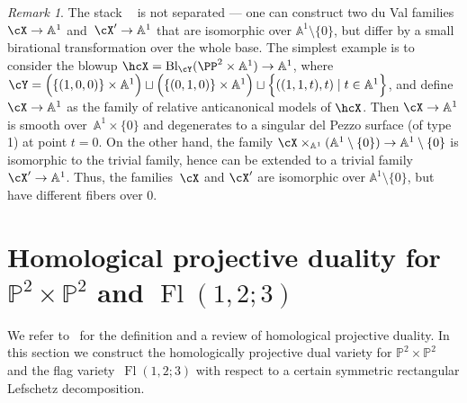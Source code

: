 \documentclass[11pt]{amsart}
\renewcommand{\AA}{{\mathbb{A}}}
\renewcommand{\P}{{\mathbb{P}}}
\DeclareMathOperator{\Bl}{\mathrm{Bl}}
\DeclareMathOperator{\Fl}{\mathrm{Fl}}
\DeclareMathOperator{\DP}{{\mathfrak{DP}_6}}
\theoremstyle{plain}
\theoremstyle{definition}
\theoremstyle{remark}
\newtheorem{remark}[theorem]{Remark}
\begin{document}
\begin{remark}
The stack $\DP$ is not separated ---
one can construct two du Val families $\cX \to \AA^1$ and~$\cX' \to \AA^1$ that are isomorphic over $\AA^1 \setminus \{0\}$, but differ by a small birational transformation over the whole base.
The simplest example is to consider the blowup $\hcX = \Bl_{\cY}(\PP^2 \times \AA^1) \to \AA^1$, 
where $\cY = \Big(\{(1,0,0)\} \times \AA^1\Big) \sqcup \Big(\{(0,1,0)\} \times \AA^1\Big) \sqcup \Big\{ ((1,1,t),t) \mid t \in \AA^1 \Big\}$,
and define $\cX \to \AA^1$ as the family of relative anticanonical models of $\hcX$.
Then $\cX \to \AA^1$ is smooth over~$\AA^1 \times \{0\}$ and degenerates to a singular del Pezzo surface (of type 1) at point $t = 0$.
On the other hand, the family $\cX \times_{\AA^1} (\AA^1 \setminus \{0\}) \to \AA^1 \setminus \{0\}$ is isomorphic to the trivial family, hence can be extended to a trivial family $\cX' \to \AA^1$.
Thus, the families~$\cX$ and $\cX'$ are isomorphic over $\AA^1 \setminus \{0\}$, but have different fibers over $0$.
\end{remark}


\section{Homological projective duality for $\P^2 \times \P^2$ and $\Fl(1,2;3)$}\label{appendix:hpd-p2p2}

We refer to~\cite{kuznetsov2007hpd,icm2014,thomas2015notes} for the definition and a review of homological projective duality.
In this section we construct the homologically projective dual variety for $\P^2 \times \P^2$ and the flag variety~$\Fl(1,2;3)$ with respect to a certain symmetric rectangular Lefschetz decomposition.
\end{document}
